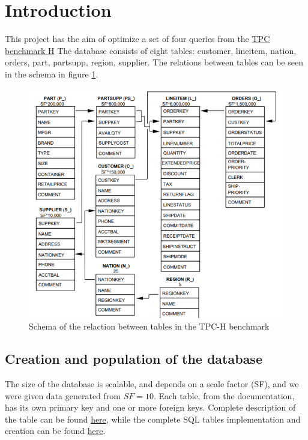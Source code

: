 \section{Introduction}

This project has the aim of optimize a set of four queries from the \href{www.tpc.org/tpc\_documents\_current\_versions/pdf/tpch\_v3.0.1.pdf}{TPC benchmark H}
The database consists of eight tables: customer, lineitem,
nation, orders, part, partsupp, region, supplier. The relations between tables can be seen in the schema in figure \ref{fig:rel_schema}.

\begin{figure}[h!]
    \centering
    \includegraphics[scale=0.45]{images/rel_schema.png}
    \caption{Schema of the relaction between tables in the TPC-H benchmark}
    \label{fig:rel_schema}
\end{figure}

\subsection{Creation and population of the database}

The size of the database is scalable, and depends on a scale factor (SF), and we were given data generated from $SF=10$. Each table, from the documentation, has its own primary key and one or more foreign keys. Complete description of the table can be found \href{www.tpc.org/tpc\_documents\_current\_versions/pdf/tpch\_v3.0.1.pdf}{here}, while the complete SQL tables implementation and creation can be found \href{https://github.com/ValentinisAlessio/DM_Final_Project/blob/main/dbms.ipynb}{here}.

